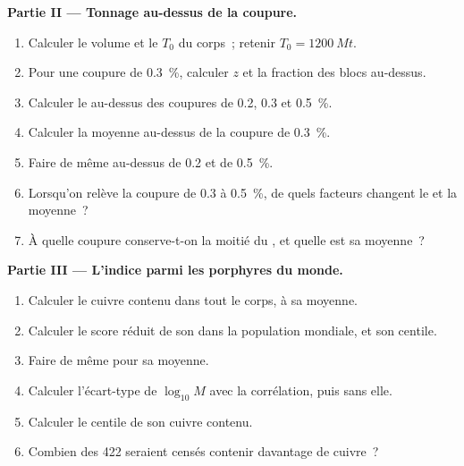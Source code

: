 \begin{problem}
\noindent\textbf{Partie II --- Tonnage au-dessus de la coupure.}
\begin{enumerate}[resume]
  \item Calculer le volume et le  $T_0$ du corps~; retenir $T_0 = \qty{1200}{Mt}$.
  \item Pour une coupure de \qty{0.3}{\percent}, calculer $z$ et la fraction des blocs au-dessus.
  \item Calculer le  au-dessus des coupures de 0.2, 0.3 et \qty{0.5}{\percent}.
  \item Calculer la  moyenne au-dessus de la coupure de \qty{0.3}{\percent}.
  \item Faire de même au-dessus de 0.2 et de \qty{0.5}{\percent}.
  \item Lorsqu'on relève la coupure de 0.3 à \qty{0.5}{\percent}, de quels facteurs changent le  et la
         moyenne~?
  \item À quelle coupure conserve-t-on la moitié du , et quelle est sa  moyenne~?
\end{enumerate}

\noindent\textbf{Partie III --- L'indice parmi les porphyres du monde.}
\begin{enumerate}[resume]
  \item Calculer le cuivre contenu dans tout le corps, à sa  moyenne.
  \item Calculer le score réduit de son  dans la population mondiale, et son centile.
  \item Faire de même pour sa  moyenne.
  \item Calculer l'écart-type de $\log_{10} M$ avec la corrélation, puis sans elle.
  \item Calculer le centile de son cuivre contenu.
  \item Combien des 422  seraient censés contenir davantage de cuivre~?
\end{enumerate}


\end{problem}

